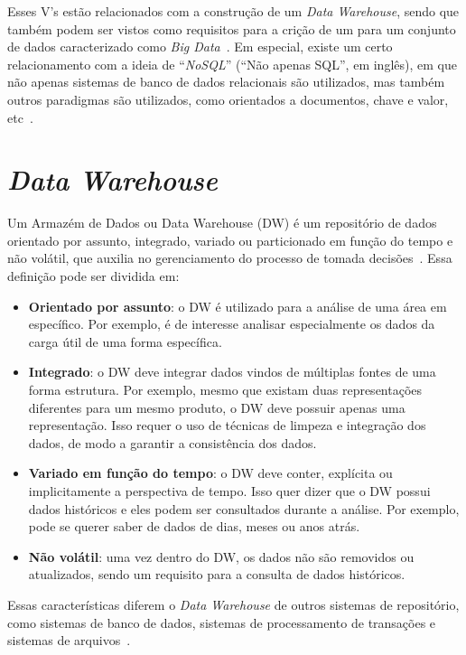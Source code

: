 Esses V's estão relacionados com a construção de um \textit{Data Warehouse}, sendo que também podem ser vistos como requisitos para a crição de um para um conjunto de dados caracterizado como \textit{Big Data}~\cite{zhangBigDataFramework2017}.
Em especial, existe um certo relacionamento com a ideia de ``\textit{NoSQL}'' (``Não apenas SQL'', em inglês), em que não apenas sistemas de banco de dados relacionais são utilizados, mas também outros paradigmas são utilizados, como orientados a documentos, chave e valor, etc~\cite{bimonteOpenIssuesBig2016}.

\section{\textit{Data Warehouse}}\label{ch:fun:dw}

Um Armazém de Dados ou Data Warehouse (DW) é um repositório de dados orientado por assunto, integrado, variado ou particionado em função do tempo e não volátil, que auxilia no gerenciamento do processo de tomada decisões~\cite{inmonUsingDataWarehouse1994}.
Essa definição pode ser dividida em:

\begin{itemize}
	\item \textbf{Orientado por assunto}: o DW é utilizado para a análise de uma área em específico.
Por exemplo, é de interesse analisar especialmente os dados da carga útil de uma forma específica.
	\item \textbf{Integrado}: o DW deve integrar dados vindos de múltiplas fontes de uma forma estrutura.
Por exemplo, mesmo que existam duas representações diferentes para um mesmo produto, o DW deve possuir apenas uma representação.
Isso requer o uso de técnicas de limpeza e integração dos dados, de modo a garantir a consistência dos dados.
	\item \textbf{Variado em função do tempo}: o DW deve conter, explícita ou implicitamente a perspectiva de tempo.
Isso quer dizer que o DW possui dados históricos e eles podem ser consultados durante a análise.
Por exemplo, pode se querer saber de dados de dias, meses ou anos atrás.
	\item \textbf{Não volátil}: uma vez dentro do DW, os dados não são removidos ou atualizados, sendo um requisito para a consulta de dados históricos.
\end{itemize}

Essas características diferem o \textit{Data Warehouse} de outros sistemas de repositório, como sistemas de banco de dados, sistemas de processamento de transações e sistemas de arquivos~\cite{hanDataMiningConcepts2011}.

